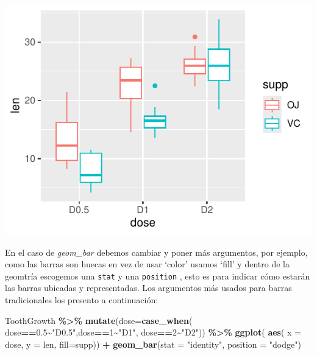 \documentclass[
]{book}
\newenvironment{Shaded}{\begin{snugshade}}{\end{snugshade}}
\newcommand{\AttributeTok}[1]{\textcolor[rgb]{0.13,0.29,0.53}{#1}}
\newcommand{\DecValTok}[1]{\textcolor[rgb]{0.00,0.00,0.81}{#1}}
\newcommand{\FloatTok}[1]{\textcolor[rgb]{0.00,0.00,0.81}{#1}}
\newcommand{\FunctionTok}[1]{\textcolor[rgb]{0.13,0.29,0.53}{\textbf{#1}}}
\newcommand{\NormalTok}[1]{#1}
\newcommand{\SpecialCharTok}[1]{\textcolor[rgb]{0.81,0.36,0.00}{\textbf{#1}}}
\newcommand{\StringTok}[1]{\textcolor[rgb]{0.31,0.60,0.02}{#1}}
\begin{document}
\begin{center}\includegraphics{R_Manual_files/figure-latex/unnamed-chunk-208-1} \end{center}

En el caso de \emph{geom\_bar} debemos cambiar y poner más argumentos, por ejemplo, como las barras son huecas en vez de usar `color' usamos `fill' y dentro de la geomtría escogemos una \texttt{stat} y una \texttt{position} , esto es para indicar cómo estarán las barras ubicadas y representadas.
Los argumentos más usados para barras tradicionales los presento a continuación:

\begin{Shaded}
\begin{Highlighting}[]
\NormalTok{ToothGrowth }\SpecialCharTok{\%\textgreater{}\%}  \FunctionTok{mutate}\NormalTok{(}\AttributeTok{dose=}\FunctionTok{case\_when}\NormalTok{(}
\NormalTok{  dose}\SpecialCharTok{==}\FloatTok{0.5}\SpecialCharTok{\textasciitilde{}}\StringTok{"D0.5"}\NormalTok{,dose}\SpecialCharTok{==}\DecValTok{1}\SpecialCharTok{\textasciitilde{}}\StringTok{"D1"}\NormalTok{, dose}\SpecialCharTok{==}\DecValTok{2}\SpecialCharTok{\textasciitilde{}}\StringTok{"D2"}\NormalTok{)) }\SpecialCharTok{\%\textgreater{}\%} \FunctionTok{ggplot}\NormalTok{(}
    \FunctionTok{aes}\NormalTok{( }\AttributeTok{x =}\NormalTok{ dose, }\AttributeTok{y =}\NormalTok{ len, }\AttributeTok{fill=}\NormalTok{supp)) }\SpecialCharTok{+}  \FunctionTok{geom\_bar}\NormalTok{(}\AttributeTok{stat =} \StringTok{"identity"}\NormalTok{, }\AttributeTok{position =} \StringTok{"dodge"}\NormalTok{)}
\end{Highlighting}
\end{Shaded}
\end{document}
